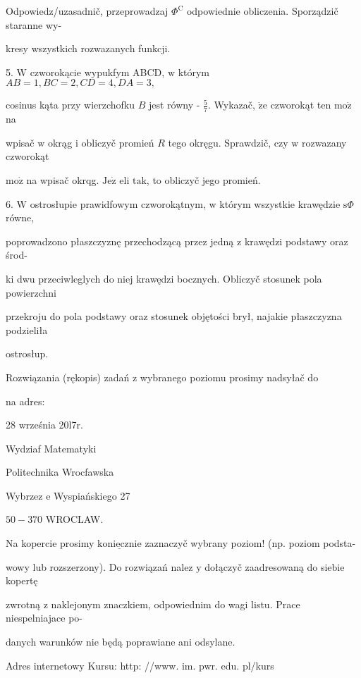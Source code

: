 \documentclass[a4paper,12pt]{article}
\begin{document}
Odpowiedz/uzasadnič, przeprowadzaj $\Phi^{\mathrm{C}}$ odpowiednie obliczenia. Sporządzič staranne wy-

kresy wszystkich rozwazanych funkcji.

5. $\mathrm{W}$ czworokącie wypukfym ABCD, $\mathrm{w}$ którym $AB= 1, BC = 2, CD = 4, DA = 3,$

cosinus kąta przy wierzchofku $B$ jest równy - $\displaystyle \frac{5}{7}$. Wykazač, $\dot{\mathrm{z}}\mathrm{e}$ czworokąt ten $\mathrm{m}\mathrm{o}\dot{\mathrm{z}}$ na

wpisač $\mathrm{w}$ okrąg $\mathrm{i}$ obliczyč promień $R$ tego okręgu. Sprawdzič, czy $\mathrm{w}$ rozwazany czworokąt

$\mathrm{m}\mathrm{o}\dot{\mathrm{z}}$ na wpisač okrqg. $\mathrm{J}\mathrm{e}\dot{\mathrm{z}}$ eli $\mathrm{t}\mathrm{a}\mathrm{k}$, to obliczyč jego promień.

6. $\mathrm{W}$ ostrosłupie prawidfowym czworokątnym, $\mathrm{w}$ którym wszystkie krawędzie $\mathrm{s}\Phi$ równe,

poprowadzono płaszczyznę przechodzącą przez jedną $\mathrm{z}$ krawędzi podstawy oraz środ-

ki dwu przeciwleglych do niej krawędzi bocznych. Obliczyč stosunek pola powierzchni

przekroju do pola podstawy oraz stosunek objętości brył, najakie płaszczyzna podzieliła

ostrosłup.

Rozwiązania (rękopis) zadań z wybranego poziomu prosimy nadsyłač do

na adres:

28 września 20l7r.

Wydziaf Matematyki

Politechnika Wrocfawska

Wybrzez $\mathrm{e}$ Wyspiańskiego 27

$50-370$ WROCLAW.

Na kopercie prosimy $\underline{\mathrm{k}\mathrm{o}\mathrm{n}\mathrm{i}\mathrm{e}\mathrm{c}\mathrm{z}\mathrm{n}\mathrm{i}\mathrm{e}}$ zaznaczyč wybrany poziom! (np. poziom podsta-

wowy lub rozszerzony). Do rozwiązań nalez $\mathrm{y}$ dołączyč zaadresowaną do siebie kopertę

zwrotną $\mathrm{z}$ naklejonym znaczkiem, odpowiednim do wagi listu. Prace niespelniajace po-

danych warunków nie będą poprawiane ani odsylane.

Adres internetowy Kursu: http: //www. im. pwr. edu. pl/kurs
\end{document}
